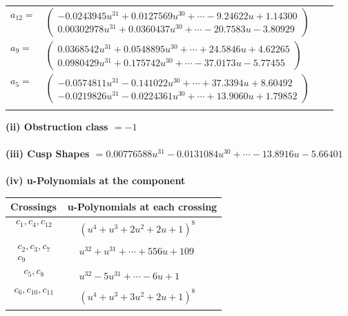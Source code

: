 \documentclass[1p]{elsarticle_modified}
\theoremstyle{definition}
\begin{document}
\begin{tabular}{m{7pt} m{180pt} m{7pt} m{180pt} }
\flushright $a_{12}=$&$\begin{pmatrix}-0.0243945 u^{31}+0.0127569 u^{30}+\cdots-9.24622 u+1.14300\\0.00302978 u^{31}+0.0360437 u^{30}+\cdots-20.7583 u-3.80929\end{pmatrix}$ \\
\flushright $a_{9}=$&$\begin{pmatrix}0.0368542 u^{31}+0.0548895 u^{30}+\cdots+24.5846 u+4.62265\\0.0980429 u^{31}+0.175742 u^{30}+\cdots-37.0173 u-5.77455\end{pmatrix}$ \\
\flushright $a_{5}=$&$\begin{pmatrix}-0.0574811 u^{31}-0.141022 u^{30}+\cdots+37.3394 u+8.60492\\-0.0219826 u^{31}-0.0224361 u^{30}+\cdots+13.9060 u+1.79852\end{pmatrix}$\\&\end{tabular}
\flushleft \textbf{(ii) Obstruction class $= -1$}\\~\\
\flushleft \textbf{(iii) Cusp Shapes $= 0.00776588 u^{31}-0.0131084 u^{30}+\cdots-13.8916 u-5.66401$}\\~\\
\newpage\renewcommand{\arraystretch}{1}
\flushleft \textbf{(iv) u-Polynomials at the component}\newline \\
\begin{tabular}{m{50pt}|m{274pt}}
Crossings & \hspace{64pt}u-Polynomials at each crossing \\
\hline $$\begin{aligned}c_{1},c_{4},c_{12}\end{aligned}$$&$\begin{aligned}
&(u^4+u^3+2 u^2+2 u+1)^8
\end{aligned}$\\
\hline $$\begin{aligned}c_{2},c_{3},c_{7}\\c_{9}\end{aligned}$$&$\begin{aligned}
&u^{32}+u^{31}+\cdots+556 u+109
\end{aligned}$\\
\hline $$\begin{aligned}c_{5},c_{8}\end{aligned}$$&$\begin{aligned}
&u^{32}-5 u^{31}+\cdots-6 u+1
\end{aligned}$\\
\hline $$\begin{aligned}c_{6},c_{10},c_{11}\end{aligned}$$&$\begin{aligned}
&(u^4+u^3+3 u^2+2 u+1)^8
\end{aligned}$\\
\hline
\end{tabular}\\~\\
\end{document}
